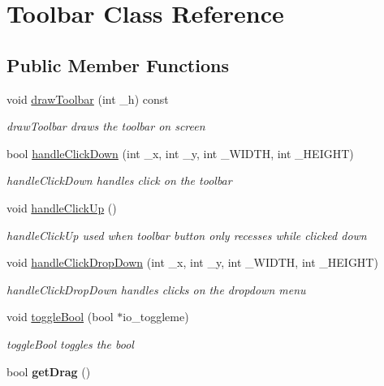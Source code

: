 \hypertarget{classToolbar}{\section{Toolbar Class Reference}
\label{classToolbar}
}
\subsection*{Public Member Functions}
\begin{DoxyCompactItemize}
\item 
void \hyperlink{classToolbar_a0f068e7ccd28541382e1acee17450526}{draw\-Toolbar} (int \-\_\-h) const 
\begin{DoxyCompactList}\small\item\em draw\-Toolbar draws the toolbar on screen \end{DoxyCompactList}\item 
bool \hyperlink{classToolbar_a56977a2f551139471efd88a1ff471ccd}{handle\-Click\-Down} (int \-\_\-x, int \-\_\-y, int \-\_\-\-W\-I\-D\-T\-H, int \-\_\-\-H\-E\-I\-G\-H\-T)
\begin{DoxyCompactList}\small\item\em handle\-Click\-Down handles click on the toolbar \end{DoxyCompactList}\item 
\hypertarget{classToolbar_af9d231b63616a033490e8ac8d0c9f33b}{void \hyperlink{classToolbar_af9d231b63616a033490e8ac8d0c9f33b}{handle\-Click\-Up} ()}\label{classToolbar_af9d231b63616a033490e8ac8d0c9f33b}

\begin{DoxyCompactList}\small\item\em handle\-Click\-Up used when toolbar button only recesses while clicked down \end{DoxyCompactList}\item 
void \hyperlink{classToolbar_ac6227f656f1e27e143e4d0fd34df85cd}{handle\-Click\-Drop\-Down} (int \-\_\-x, int \-\_\-y, int \-\_\-\-W\-I\-D\-T\-H, int \-\_\-\-H\-E\-I\-G\-H\-T)
\begin{DoxyCompactList}\small\item\em handle\-Click\-Drop\-Down handles clicks on the dropdown menu \end{DoxyCompactList}\item 
void \hyperlink{classToolbar_a742772fb36768a80c2998cf135c65022}{toggle\-Bool} (bool $\ast$io\-\_\-toggleme)
\begin{DoxyCompactList}\small\item\em toggle\-Bool toggles the bool \end{DoxyCompactList}\item 
\hypertarget{classToolbar_a0d364406eeb8b7233850308b0eaf9a59}{bool {\bfseries get\-Drag} ()}\label{classToolbar_a0d364406eeb8b7233850308b0eaf9a59}


\end{DoxyCompactItemize}
